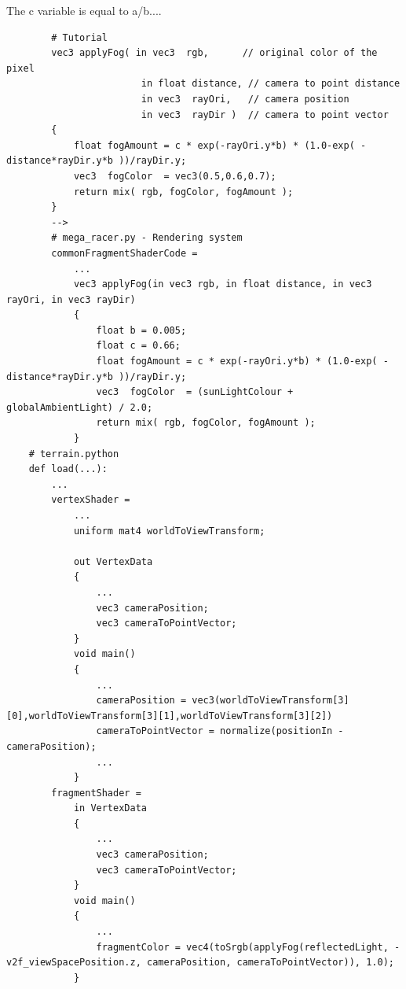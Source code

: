 \documentclass[a4 paper, 12pt]{article}
\begin{document}
The c variable is equal to a/b....
    \begin{lstlisting}
        # Tutorial
        vec3 applyFog( in vec3  rgb,      // original color of the pixel
                        in float distance, // camera to point distance
                        in vec3  rayOri,   // camera position
                        in vec3  rayDir )  // camera to point vector
        {
            float fogAmount = c * exp(-rayOri.y*b) * (1.0-exp( -distance*rayDir.y*b ))/rayDir.y;
            vec3  fogColor  = vec3(0.5,0.6,0.7);
            return mix( rgb, fogColor, fogAmount );
        }
        -->
        # mega_racer.py - Rendering system
        commonFragmentShaderCode = 
            ...
            vec3 applyFog(in vec3 rgb, in float distance, in vec3  rayOri, in vec3 rayDir)
            {
                float b = 0.005;
                float c = 0.66;
                float fogAmount = c * exp(-rayOri.y*b) * (1.0-exp( -distance*rayDir.y*b ))/rayDir.y;
                vec3  fogColor  = (sunLightColour + globalAmbientLight) / 2.0;
                return mix( rgb, fogColor, fogAmount );
            }
    # terrain.python
    def load(...):
        ...
        vertexShader =
            ...
            uniform mat4 worldToViewTransform;

            out VertexData
            {
                ...
                vec3 cameraPosition;
                vec3 cameraToPointVector;
            }
            void main()
            {
                ...
                cameraPosition = vec3(worldToViewTransform[3][0],worldToViewTransform[3][1],worldToViewTransform[3][2])
                cameraToPointVector = normalize(positionIn - cameraPosition);
                ...
            }
        fragmentShader = 
            in VertexData
            {
                ...
                vec3 cameraPosition;
                vec3 cameraToPointVector;
            }
            void main()
            {
                ...
                fragmentColor = vec4(toSrgb(applyFog(reflectedLight, -v2f_viewSpacePosition.z, cameraPosition, cameraToPointVector)), 1.0);
            }
    \end{lstlisting} 
\end{document}
